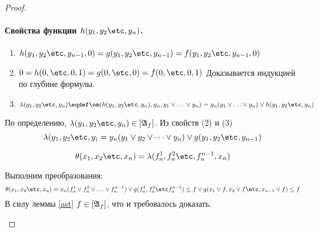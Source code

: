 \documentclass[unicode, 10pt, a4paper, oneside, fleqn]{article}
\begin{document}
\begin{proof}
\begin{itemize}
\begin{itemize}
\begin{itemize}
              \paragraph {Свойства функции $h(\set[y]{n})$.}
              \begin{enumerate}
                \item 
                  \begin{math}
                    h(\set[y]{n-1},0)=g(\set[y]{n-1}) = f(\set[y]{n-1},0)
                  \end{math}
                \item \ACC 
                  \begin{math}
                    0 = h(0,\etc,0,1) = g(0,\etc,0) = f(0,\etc,0,1)
                  \end{math}
                  Доказывается индукцией по глубине формулы. \PROOF
                \item  
                  \begin{denote}
                    \begin{displaymath}
                      \lambda(\set[y]{n})\eqdef \om(h(\set[y]{n}),y_{n},\svee[y]{1}{n}) =y_n(\svee[y]{1}{n})\vee h(\set[y]{n})
                    \end{displaymath}
                  \end{denote}
              \end{enumerate}
              По определению, $\lambda(\set[y]{n}) \in [\ag_f]$. Из свойств (2) и (3) 
              \begin{displaymath}
                \lambda(\set[y])=y_n(\dsn[y])\vee g(y_1,y_2\etc,y_{n-1})
              \end{displaymath}
              \begin{denote}
                \begin{displaymath}
                  \theta(\set[x]{n})=\lambda(f^1_n,f^2_n\etc,f^{n-1}_n,x_n)
                \end{displaymath}
              \end{denote}
              Выполним преобразования:\\
              \begin{displaymath}
              \theta(\set[x]{n})=x_n(f^1_n\vee f^2_n\vee\ldots\vee f^{n-1}_n)\vee g(f^1_n,f^2_n\etc f^{n-1}_n)
              \le f\vee g(x_1\vee f,x_2\vee f\etc,x_{n-1}\vee f) \le f
              \end{displaymath}
              В силу леммы \ref{ast} $f\in[\mathfrak{A}_f]$, что и требовалось доказать.
          \end{itemize}
      \end{itemize}
  \end{itemize}
\end{proof}
\end{document}
